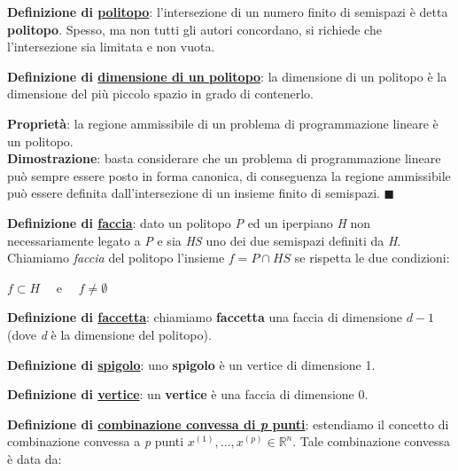 \documentclass[11pt, oneside]{book}
\begin{document}
{\bf Definizione di \underline{politopo}}: l'intersezione di un numero
finito di semispazi \`e detta {\bf politopo}. Spesso, ma non tutti gli
autori concordano, si richiede che l'intersezione sia limitata e non
vuota.

\par\bigskip

{\bf Definizione di \underline{dimensione di un politopo}}: la
dimensione di un politopo \`e la dimensione del pi\`u piccolo spazio
in grado di contenerlo. 

\par\bigskip

{\bf Propriet\`a}: la regione ammissibile di un problema di
programmazione lineare \`e un politopo.\\ {\bf Dimostrazione}: basta
considerare che un problema di programmazione lineare pu\`o sempre
essere posto in forma canonica, di conseguenza la regione ammissibile
pu\`o essere definita dall'intersezione di un insieme finito di
semispazi. $\blacksquare$

\par\bigskip

{\bf Definizione di \underline{faccia}}: dato un politopo {\em P} ed
un iperpiano {\em H} non necessariamente legato a {\em P} e sia {\em
  HS} uno dei due semispazi definiti da {\em H}. Chiamiamo {\em
  faccia} del politopo l'insieme $f = P \cap HS$ se rispetta le due
condizioni:

\begin{center}
$f \subset H \quad$ e $\quad f \neq \emptyset$
\end{center}

\par\bigskip

{\bf Definizione di \underline{faccetta}}: chiamiamo {\bf faccetta}
una faccia di dimensione $d-1$ (dove {\em d} \`e la dimensione del
politopo).

\par\bigskip

{\bf Definizione di \underline{spigolo}}: uno {\bf spigolo} \`e un
vertice di dimensione 1.

\par\bigskip

{\bf Definizione di \underline{vertice}}: un {\bf vertice} \`e una
faccia di dimensione 0.

\par\bigskip

{\bf Definizione di \underline{combinazione convessa di {\em p}
    punti}}: estendiamo il concetto di combinazione convessa a {\em p}
punti $x^{(1)},\dots,x^{(p)} \in \mathbb{R}^n$. Tale combinazione
convessa \`e data da:
\end{document}
